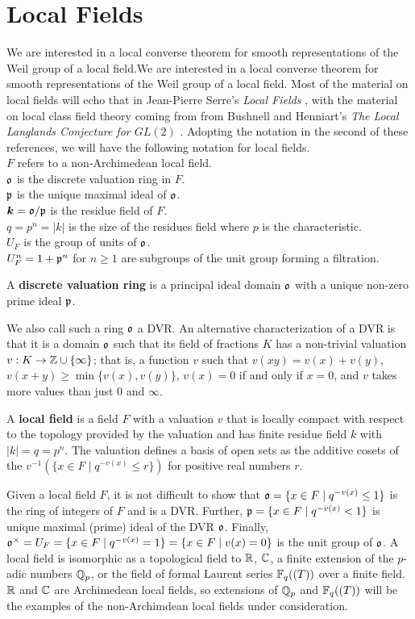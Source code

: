 \section{Local Fields}
We are interested in a local converse theorem for smooth representations of the Weil group of a local field.We are interested in a local converse theorem for smooth representations of the Weil group of a local field.
Most of the material on local fields will echo that in Jean-Pierre Serre's \textit{Local Fields} \cite{Serre1979}, with the material on local class field theory coming from from Bushnell and Henniart's \textit{The Local Langlands Conjecture for $GL(2)$} \cite{Bushnell2006}.
Adopting the notation in the second of these references, we will have the following notation for local fields.\\
$F$ refers to a non-Archimedean local field.\\
$\mathfrak{o}$ is the discrete valuation ring in $F$.\\
$\mathfrak{p}$ is the unique maximal ideal of $\mathfrak{o}$.\\
$\bm{k} = \mathfrak{o}/\mathfrak{p}$ is the residue field of $F$.\\
$q = p^n = |k|$ is the size of the residues field where $p$ is the characteristic.\\
$U_F$ is the group of units of $\mathfrak{o}$.\\
$U_F^n = 1 + \mathfrak{p}^n$ for $n \geq 1$ are subgroups of the unit group forming a filtration.\\
\begin{defn}
  A \textbf{discrete valuation ring} is a principal ideal domain $\mathfrak{o}$ with a unique non-zero prime ideal $\mathfrak{p}$.
\end{defn}
We also call such a ring $\mathfrak{o}$ a DVR.
An alternative characterization of a DVR is that it is a domain $\mathfrak{o}$ such that its field of fractions $K$ has a non-trivial valuation $v : K \to \mathbb{Z} \cup \{ \infty \}$; that is, a function $v$ such that $v(xy) = v(x) + v(y)$, $v(x+y) \geq \min \{v(x),v(y)\}$, $v(x) = 0$ if and only if $x = 0$, and $v$ takes more values than just $0$ and $\infty$.
\begin{defn}
  A \textbf{local field} is a field $F$ with a valuation $v$ that is locally compact with respect to the topology provided by the valuation and has finite residue field $k$ with $|k| = q = p^n$.
  The valuation defines a basis of open sets as the additive cosets of the $v^{-1}(\{x \in F \mid q^{-v(x)} \leq r\})$ for positive real numbers $r$.
\end{defn}
Given a local field $F$, it is not difficult to show that $\mathfrak{o} = \{x \in F \mid q^{-v(x)} \leq 1\}$ is the ring of integers of $F$ and is a DVR.
Further, $\mathfrak{p} = \{x \in F \mid q^{-v(x)} < 1\}$ is unique maximal (prime) ideal of the DVR $\mathfrak{o}$.
Finally, $\mathfrak{o}^\times = U_F = \{x \in F \mid q^{-v(x)} = 1\} = \{x \in F \mid v(x) = 0\}$ is the unit group of $\mathfrak{o}$.
A local field is isomorphic as a topological field to $\mathbb{R}$, $\mathbb{C}$, a finite extension of the $p$-adic numbers $\mathbb{Q}_p$, or the field of formal Laurent series $\mathbb{F}_q((T))$ over a finite field.
$\mathbb{R}$ and $\mathbb{C}$ are Archimedean local fields, so extensions of $\mathbb{Q}_p$ and $\mathbb{F}_q((T))$ will be the examples of the non-Archimdean local fields under consideration.
\\

